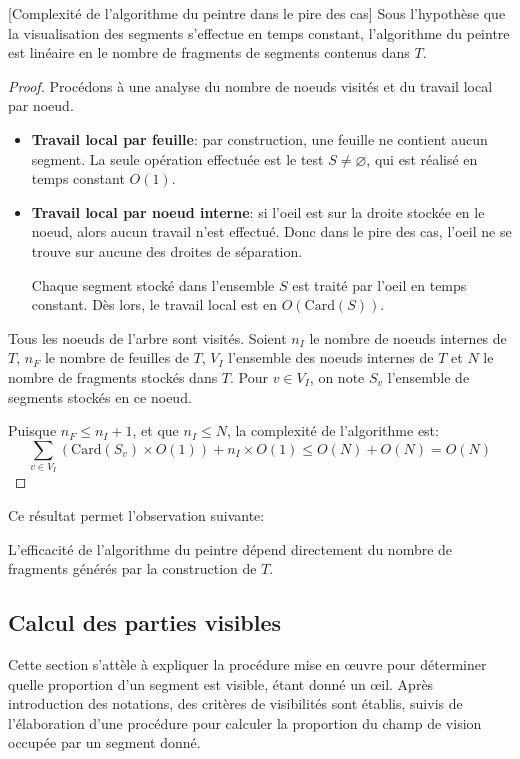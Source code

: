\begin{prop}\label{compl:painter}[Complexité de l'algorithme du peintre dans le pire des cas]
  Sous l'hypothèse que la visualisation des segments s'effectue
  en temps constant, l'algorithme du peintre est linéaire en le
  nombre de fragments de segments contenus dans $T$.
\end{prop}
\begin{proof}
  Procédons à une analyse du nombre de noeuds visités et du travail local
  par noeud.
  \begin{itemize}
  \item \textbf{Travail local par feuille}: par construction, une feuille
    ne contient aucun segment. La seule opération effectuée est le test
    $S\neq \varnothing$, qui est réalisé en temps constant $O(1)$.
  \item \textbf{Travail local par noeud interne}: si l'oeil est sur la droite
    stockée en le noeud, alors aucun travail n'est effectué. Donc dans le
    pire des cas, l'oeil ne se trouve sur aucune des droites de séparation.

    Chaque segment stocké dans l'ensemble $S$ est traité par l'oeil en
    temps constant. Dès lors, le travail local est en $O(\mathrm{Card}(S))$.
  \end{itemize}
  Tous les noeuds de l'arbre sont visités. Soient $n_I$ le nombre de noeuds
  internes de $T$, $n_F$ le nombre de feuilles de $T$, $V_I$ l'ensemble des
  noeuds internes de $T$ et $N$ le nombre
  de fragments stockés dans $T$.
  Pour $v\in V_I$, on note $S_v$ l'ensemble de segments stockés en ce noeud.

  Puisque $n_F \leq n_I + 1$, et que $n_I\leq N$,
  la complexité de l'algorithme est:
  $$ \sum_{v\in V_I}\left(\mathrm{Card}(S_v)\times O(1)\right) +
  n_I \times O(1) \leq O(N) + O(N) = O(N)$$
\end{proof}

Ce résultat permet l'observation suivante:
\begin{cor}\label{peintre:cor}
  L'efficacité de l'algorithme du peintre dépend directement
  du nombre de fragments générés par la construction de $T$.
\end{cor}
\subsection{Calcul des parties visibles}
Cette section s'attèle à expliquer la procédure mise en \oe{}uvre pour déterminer
quelle proportion d'un segment est visible, étant donné un \oe{}il.
Après introduction des notations, des critères de visibilités sont
établis, suivis de l'élaboration d'une procédure pour calculer la
proportion du champ de vision occupée par un segment donné.

